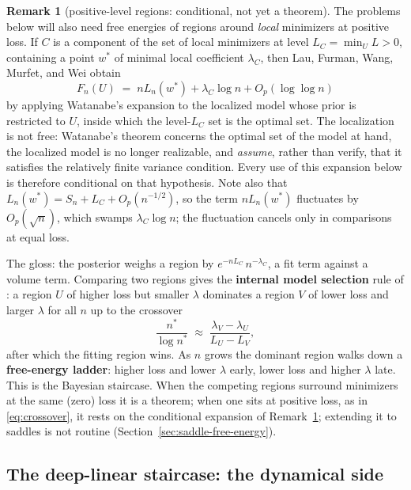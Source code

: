 \documentclass[11pt]{amsart}
\theoremstyle{plain}
\theoremstyle{definition}
\newtheorem{remark}[theorem]{Remark}
\begin{document}
\begin{remark}[positive-level regions: conditional, not yet a theorem]\label{rem:positive-level}
The problems below will also need free energies of regions around \emph{local} minimizers at positive loss. If $C$ is a component of the set of local minimizers at level $L_C = \min_U L > 0$, containing a point $w^*$ of minimal local coefficient $\lambda_C$, then Lau, Furman, Wang, Murfet, and Wei \cite{lau2023} obtain
\[
   F_n(U) \;=\; n L_n(w^*) + \lambda_C \log n + O_p(\log\log n)
\]
by applying Watanabe's expansion to the localized model whose prior is restricted to $U$, inside which the level-$L_C$ set is the optimal set. The localization is not free: Watanabe's theorem concerns the optimal set of the model at hand, the localized model is no longer realizable, and \cite{lau2023} \emph{assume}, rather than verify, that it satisfies the relatively finite variance condition. Every use of this expansion below is therefore conditional on that hypothesis. Note also that $L_n(w^*) = S_n + L_C + O_p(n^{-1/2})$, so the term $n L_n(w^*)$ fluctuates by $O_p(\sqrt n)$, which swamps $\lambda_C \log n$; the fluctuation cancels only in comparisons at equal loss.
\end{remark}

The gloss: the posterior weighs a region by $e^{-nL_C} \, n^{-\lambda_C}$, a fit term against a volume term. Comparing two regions gives the \textbf{internal model selection} rule of \cite{lehalleur2025}: a region $U$ of higher loss but smaller $\lambda$ dominates a region $V$ of lower loss and larger $\lambda$ for all $n$ up to the crossover
\begin{equation}\label{eq:crossover}
   \frac{n^*}{\log n^*} \;\approx\; \frac{\lambda_V - \lambda_U}{L_U - L_V},
\end{equation}
after which the fitting region wins. As $n$ grows the dominant region walks down a \textbf{free-energy ladder}: higher loss and lower $\lambda$ early, lower loss and higher $\lambda$ late. This is the Bayesian staircase. When the competing regions surround minimizers at the same (zero) loss it is a theorem; when one sits at positive loss, as in \eqref{eq:crossover}, it rests on the conditional expansion of Remark~\ref{rem:positive-level}; extending it to saddles is not routine (Section~\ref{sec:saddle-free-energy}).

\subsection{The deep-linear staircase: the dynamical side}\label{sec:dln}
\end{document}
